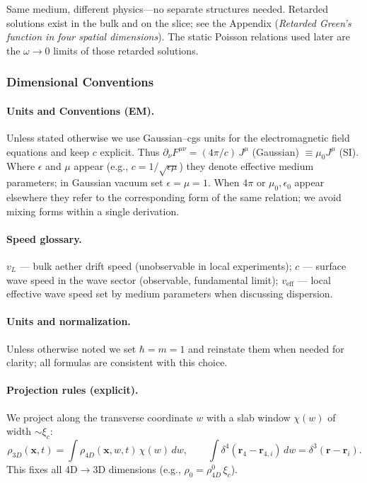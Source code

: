 Same medium, different physics---no separate structures needed. Retarded solutions exist in the bulk and on the slice; see the Appendix (\emph{Retarded Green's function in four spatial dimensions}). The static Poisson relations used later are the $\omega\to0$ limits of those retarded solutions.

\medskip
{}

\subsubsection{Dimensional Conventions}
\paragraph{Units and Conventions (EM).} Unless stated otherwise we use Gaussian--cgs units for the electromagnetic field equations and keep $c$ explicit. Thus $\partial_\nu F^{\mu\nu} = (4\pi/c)\, J^\mu$ (Gaussian) $\equiv \mu_0 J^\mu$ (SI). Where $\epsilon$ and $\mu$ appear (e.g., $c = 1/\sqrt{\epsilon\mu}$) they denote effective medium parameters; in Gaussian vacuum set $\epsilon=\mu=1$. When $4\pi$ or $\mu_0,\epsilon_0$ appear elsewhere they refer to the corresponding form of the same relation; we avoid mixing forms within a single derivation.

\paragraph{Speed glossary.} $v_L$ --- bulk aether drift speed (unobservable in local experiments); $c$ --- surface wave speed in the wave sector (observable, fundamental limit); $v_{\text{eff}}$ --- local effective wave speed set by medium parameters when discussing dispersion.

\paragraph{Units and normalization.} Unless otherwise noted we set $\hbar=m=1$ and reinstate them when needed for clarity; all formulas are consistent with this choice.

\paragraph{Projection rules (explicit).} We project along the transverse coordinate $w$ with a slab window $\chi(w)$ of width $\sim\xi_c$:
\[
\rho_{3D}(\mathbf x,t)=\int \rho_{4D}(\mathbf x,w,t)\,\chi(w)\,dw,\qquad
\int\delta^4(\mathbf r_4-\mathbf r_{4,i})\,dw=\delta^3(\mathbf r-\mathbf r_i).
\]
This fixes all 4D$\to$3D dimensions (e.g., $\rho_0=\rho_{4D}^0\,\xi_c$).

